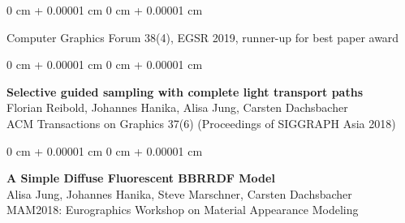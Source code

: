 \documentclass[10pt, letterpaper]{article}
\newenvironment{onecolentry}{
    \begin{adjustwidth}{
        0 cm + 0.00001 cm
    }{
        0 cm + 0.00001 cm
    }
}{
    \end{adjustwidth}
} %
\begin{document}
\begin{samepage}
\begin{onecolentry}
Computer Graphics Forum 38(4), EGSR 2019, runner-up for best paper award
    \end{onecolentry}
    \begin{onecolentry}
    \textbf{Selective guided sampling with complete light transport paths}\\
Florian Reibold, Johannes Hanika, Alisa Jung, Carsten Dachsbacher\\
ACM Transactions on Graphics 37(6) (Proceedings of SIGGRAPH Asia 2018)
    \end{onecolentry}
    \begin{onecolentry}
    \textbf{A Simple Diffuse Fluorescent BBRRDF Model}\\
    Alisa Jung, Johannes Hanika, Steve Marschner, Carsten Dachsbacher\\
    MAM2018: Eurographics Workshop on Material Appearance Modeling
    \end{onecolentry}
        \end{samepage}
\end{document}
